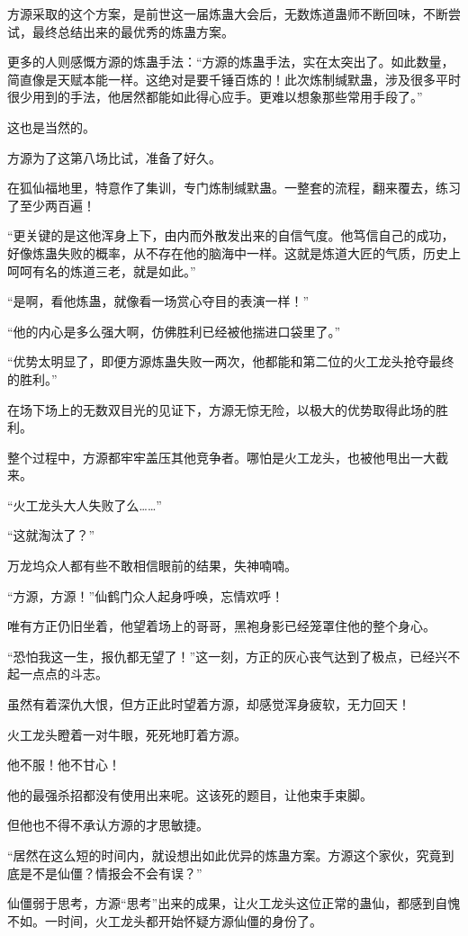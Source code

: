 \begin{this_body}
方源采取的这个方案，是前世这一届炼蛊大会后，无数炼道蛊师不断回味，不断尝试，最终总结出来的最优秀的炼蛊方案。

更多的人则感慨方源的炼蛊手法：“方源的炼蛊手法，实在太突出了。如此数量，简直像是天赋本能一样。这绝对是要千锤百炼的！此次炼制缄默蛊，涉及很多平时很少用到的手法，他居然都能如此得心应手。更难以想象那些常用手段了。”

这也是当然的。

方源为了这第八场比试，准备了好久。

在狐仙福地里，特意作了集训，专门炼制缄默蛊。一整套的流程，翻来覆去，练习了至少两百遍！

“更关键的是这他浑身上下，由内而外散发出来的自信气度。他笃信自己的成功，好像炼蛊失败的概率，从不存在他的脑海中一样。这就是炼道大匠的气质，历史上呵呵有名的炼道三老，就是如此。”

“是啊，看他炼蛊，就像看一场赏心夺目的表演一样！”

“他的内心是多么强大啊，仿佛胜利已经被他揣进口袋里了。”

“优势太明显了，即便方源炼蛊失败一两次，他都能和第二位的火工龙头抢夺最终的胜利。”

在场下场上的无数双目光的见证下，方源无惊无险，以极大的优势取得此场的胜利。

整个过程中，方源都牢牢盖压其他竞争者。哪怕是火工龙头，也被他甩出一大截来。

“火工龙头大人失败了么……”

“这就淘汰了？”

万龙坞众人都有些不敢相信眼前的结果，失神喃喃。

“方源，方源！”仙鹤门众人起身呼唤，忘情欢呼！

唯有方正仍旧坐着，他望着场上的哥哥，黑袍身影已经笼罩住他的整个身心。

“恐怕我这一生，报仇都无望了！”这一刻，方正的灰心丧气达到了极点，已经兴不起一点点的斗志。

虽然有着深仇大恨，但方正此时望着方源，却感觉浑身疲软，无力回天！

火工龙头瞪着一对牛眼，死死地盯着方源。

他不服！他不甘心！

他的最强杀招都没有使用出来呢。这该死的题目，让他束手束脚。

但他也不得不承认方源的才思敏捷。

“居然在这么短的时间内，就设想出如此优异的炼蛊方案。方源这个家伙，究竟到底是不是仙僵？情报会不会有误？”

仙僵弱于思考，方源“思考”出来的成果，让火工龙头这位正常的蛊仙，都感到自愧不如。一时间，火工龙头都开始怀疑方源仙僵的身份了。


\end{this_body}
